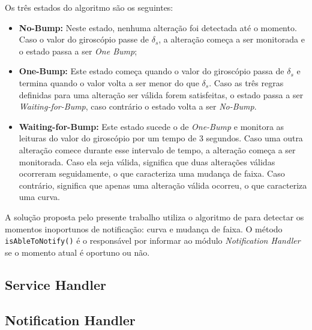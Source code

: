 Os três estados do algoritmo são os seguintes:

\begin{itemize}
  \item \textbf{No-Bump:} Neste estado, nenhuma alteração foi detectada até o momento. Caso o valor do giroscópio passe de $\delta_{s}$, a alteração começa a ser
  monitorada e o estado passa a ser \textit{One Bump};
  \item \textbf{One-Bump:} Este estado começa quando o valor do giroscópio passa de $\delta_{s}$ e termina quando o valor volta a ser menor do que $\delta_{s}$.
  Caso as três regras definidas para uma alteração ser válida forem satisfeitas, o estado passa a ser \textit{Waiting-for-Bump}, caso contrário o estado volta
  a ser \textit{No-Bump}.
  \item \textbf{Waiting-for-Bump:} Este estado sucede o de \textit{One-Bump} e monitora as leituras do valor do giroscópio por um tempo de 3 segundos. Caso
  uma outra alteração comece durante esse intervalo de tempo, a alteração começa a ser monitorada. Caso ela seja válida, significa que duas alterações válidas
  ocorreram seguidamente, o que caracteriza uma mudança de faixa. Caso contrário, significa que apenas uma alteração válida ocorreu, o que caracteriza uma curva.
\end{itemize}

A solução proposta pelo presente trabalho utiliza o algoritmo de  para detectar os momentos inoportunos de notificação: curva
e mudança de faixa. O método \lstinline[basicstyle=\ttfamily\color{black}]|isAbleToNotify()| é o responsável por informar ao módulo \textit{Notification Handler}
se o momento atual é oportuno ou não.

\subsection{Service Handler}
\label{service-handler}

\subsection{Notification Handler}
\label{notification-handler}
